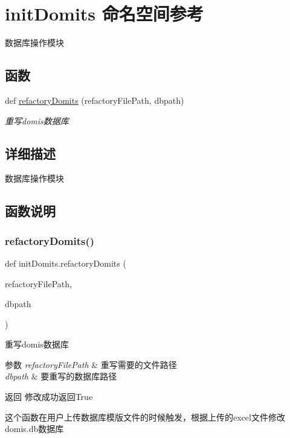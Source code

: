 \hypertarget{namespaceinit_domits}{}\section{init\+Domits 命名空间参考}
\label{namespaceinit_domits}


数据库操作模块  


\subsection*{函数}
\begin{DoxyCompactItemize}
\item 
def \mbox{\hyperlink{namespaceinit_domits_a7cf18932eaa3e3b83f60132e1de06e82}{refactory\+Domits}} (refactory\+File\+Path, dbpath)
\begin{DoxyCompactList}\small\item\em 重写domis数据库 \end{DoxyCompactList}\end{DoxyCompactItemize}


\subsection{详细描述}
数据库操作模块 

\subsection{函数说明}
\mbox{\label{namespaceinit_domits_a7cf18932eaa3e3b83f60132e1de06e82}} 
\subsubsection{\texorpdfstring{refactoryDomits()}{refactoryDomits()}}
{\footnotesize\ttfamily def init\+Domits.\+refactory\+Domits (\begin{DoxyParamCaption}\item[{}]{refactory\+File\+Path,  }\item[{}]{dbpath }\end{DoxyParamCaption})}



重写domis数据库 


\begin{DoxyParams}{参数}
{\em refactory\+File\+Path} & 重写需要的文件路径 \\
\hline
{\em dbpath} & 要重写的数据库路径 \\
\hline
\end{DoxyParams}
\begin{DoxyReturn}{返回}
修改成功返回\+True
\end{DoxyReturn}
这个函数在用户上传数据库模版文件的时候触发，根据上传的excel文件修改domis.\+db数据库 